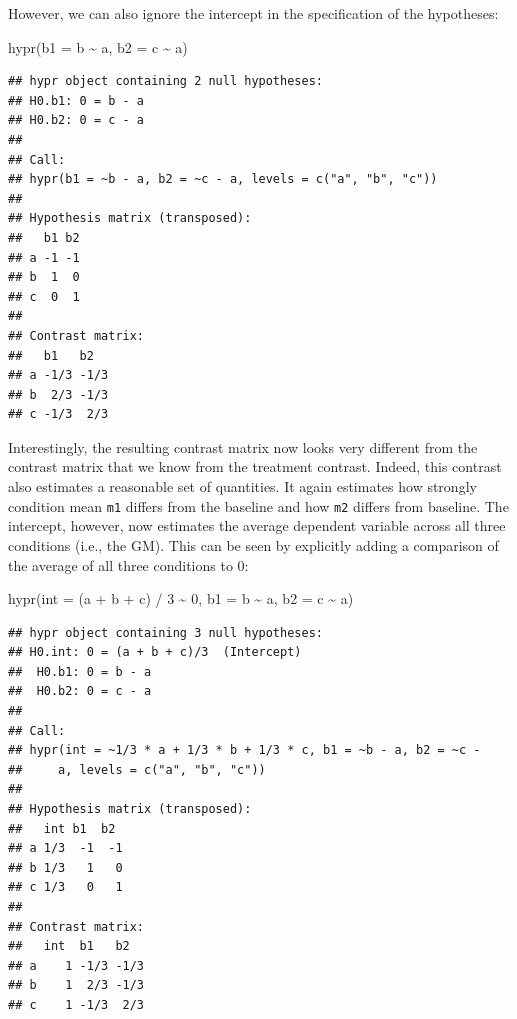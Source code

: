 \documentclass[
  12pt,
]{krantz}
\newenvironment{Shaded}{\begin{snugshade}}{\end{snugshade}}
\newcommand{\AttributeTok}[1]{\textcolor[rgb]{0.77,0.63,0.00}{#1}}
\newcommand{\DecValTok}[1]{\textcolor[rgb]{0.00,0.00,0.81}{#1}}
\newcommand{\FunctionTok}[1]{\textcolor[rgb]{0.00,0.00,0.00}{#1}}
\newcommand{\NormalTok}[1]{#1}
\newcommand{\SpecialCharTok}[1]{\textcolor[rgb]{0.00,0.00,0.00}{#1}}
\theoremstyle{definition}
\theoremstyle{definition}
\theoremstyle{definition}
\theoremstyle{definition}
\theoremstyle{remark}
\begin{document}
However, we can also ignore the intercept in the specification of the hypotheses:

\begin{Shaded}
\begin{Highlighting}[]
\FunctionTok{hypr}\NormalTok{(}\AttributeTok{b1 =}\NormalTok{ b }\SpecialCharTok{\textasciitilde{}}\NormalTok{ a, }\AttributeTok{b2 =}\NormalTok{ c }\SpecialCharTok{\textasciitilde{}}\NormalTok{ a)}
\end{Highlighting}
\end{Shaded}

\begin{verbatim}
## hypr object containing 2 null hypotheses:
## H0.b1: 0 = b - a
## H0.b2: 0 = c - a
## 
## Call:
## hypr(b1 = ~b - a, b2 = ~c - a, levels = c("a", "b", "c"))
## 
## Hypothesis matrix (transposed):
##   b1 b2
## a -1 -1
## b  1  0
## c  0  1
## 
## Contrast matrix:
##   b1   b2  
## a -1/3 -1/3
## b  2/3 -1/3
## c -1/3  2/3
\end{verbatim}

Interestingly, the resulting contrast matrix now looks very different from the contrast matrix that we know from the treatment contrast. Indeed, this contrast also estimates a reasonable set of quantities. It again estimates how strongly condition mean \texttt{m1} differs from the baseline and how \texttt{m2} differs from baseline. The intercept, however, now estimates the average dependent variable across all three conditions (i.e., the GM). This can be seen by explicitly adding a comparison of the average of all three conditions to 0:

\begin{Shaded}
\begin{Highlighting}[]
\FunctionTok{hypr}\NormalTok{(}\AttributeTok{int =}\NormalTok{ (a }\SpecialCharTok{+}\NormalTok{ b }\SpecialCharTok{+}\NormalTok{ c) }\SpecialCharTok{/} \DecValTok{3} \SpecialCharTok{\textasciitilde{}} \DecValTok{0}\NormalTok{, }\AttributeTok{b1 =}\NormalTok{ b }\SpecialCharTok{\textasciitilde{}}\NormalTok{ a, }\AttributeTok{b2 =}\NormalTok{ c }\SpecialCharTok{\textasciitilde{}}\NormalTok{ a)}
\end{Highlighting}
\end{Shaded}

\begin{verbatim}
## hypr object containing 3 null hypotheses:
## H0.int: 0 = (a + b + c)/3  (Intercept)
##  H0.b1: 0 = b - a
##  H0.b2: 0 = c - a
## 
## Call:
## hypr(int = ~1/3 * a + 1/3 * b + 1/3 * c, b1 = ~b - a, b2 = ~c - 
##     a, levels = c("a", "b", "c"))
## 
## Hypothesis matrix (transposed):
##   int b1  b2 
## a 1/3  -1  -1
## b 1/3   1   0
## c 1/3   0   1
## 
## Contrast matrix:
##   int  b1   b2  
## a    1 -1/3 -1/3
## b    1  2/3 -1/3
## c    1 -1/3  2/3
\end{verbatim}
\end{document}
